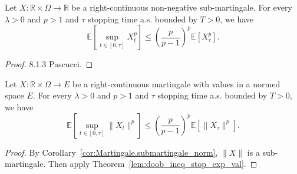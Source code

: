 \begin{lemma}\label{lem:doob_ineq_stop_exp_val}
  Let $X:\mathbb{R}\times\Omega\rightarrow \mathbb{R}$ be a right-continuous non-negative sub-martingale.
  For every $\lambda>0$ and $p>1$ and $\tau$ stopping time a.s. bounded by $T>0$, we have
  $$
  \mathbb{E}\left[ \sup_{t\in[0,\tau]}X_t^p \right]\leq \left(\frac{p}{p-1}\right)^p\mathbb{E}[X_\tau^p].
  $$
\end{lemma}
\begin{proof}
  8.1.3 Pascucci.
\end{proof}

\begin{corollary}\label{cor:doob_ineq_stop_exp_val}
  Let $X:\mathbb{R}\times\Omega\rightarrow E$ be a right-continuous martingale with values in a normed space $E$.
  For every $\lambda>0$ and $p>1$ and $\tau$ stopping time a.s. bounded by $T>0$, we have
  $$
  \mathbb{E}\left[ \sup_{t\in[0,\tau]}\lVert X_t \rVert^p \right]\leq \left(\frac{p}{p-1}\right)^p\mathbb{E}[\lVert X_\tau \rVert^p].
  $$
\end{corollary}
\begin{proof}
  By Corollary~\ref{cor:Martingale.submartingale_norm}, $\lVert X \rVert$ is a sub-martingale.
  Then apply Theorem~\ref{lem:doob_ineq_stop_exp_val}.
\end{proof}

